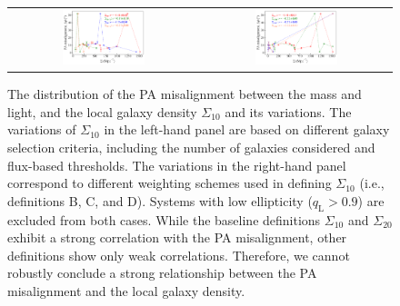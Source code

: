 \documentclass{aa}
\newcommand{\newedit}[1]{{#1}} %
\begin{document}
\begin{figure}[htbp]
    \centering
    \begin{tabular}{cc}
        \includegraphics[width=0.45\textwidth]{figures/position_angle_offset_vs_Sigma_all_ex_q_l.pdf} &
        \includegraphics[width=0.45\textwidth]{figures/position_angle_offset_vs_Sigma_10AtoD_ex_q_l.pdf} \\
    \end{tabular}
    \caption{\newedit{
    The distribution of the PA misalignment between the mass and light, and the local galaxy density $\Sigma_{10}$ and its variations. The variations of $\Sigma_{10}$ in the left-hand panel are based on different galaxy selection criteria, including the number of galaxies considered and flux-based thresholds. The variations in the right-hand panel correspond to different weighting schemes used in defining $\Sigma_{10}$ (i.e., definitions B, C, and D). Systems with low ellipticity ($q_\text{L} > 0.9$) are excluded from both cases. While the baseline definitions $\Sigma_{10}$ and $\Sigma_{20}$ exhibit a strong correlation with the PA misalignment, other definitions show only weak correlations. Therefore, we cannot robustly conclude a strong relationship between the PA misalignment and the local galaxy density.}
    }
    \label{fig:pos_off_Sigma}
\end{figure}
\end{document}
